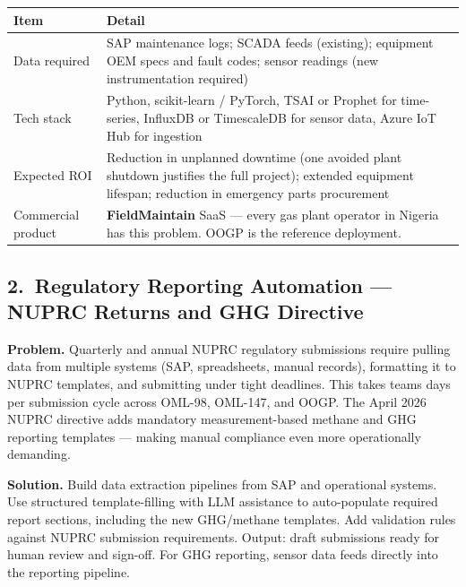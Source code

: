 \documentclass[10pt]{article}
\begin{document}
\vspace{4pt}
\small
\begin{tabularx}{\columnwidth}{@{}lX@{}}
\toprule
\textbf{Item} & \textbf{Detail} \\
\midrule
Data required     & SAP maintenance logs; SCADA feeds (existing); equipment OEM specs
                    and fault codes; sensor readings (new instrumentation required) \\
Tech stack        & Python, scikit-learn / PyTorch, TSAI or Prophet for time-series,
                    InfluxDB or TimescaleDB for sensor data, Azure IoT Hub for ingestion \\
Expected ROI      & Reduction in unplanned downtime (one avoided plant shutdown
                    justifies the full project); extended equipment lifespan; reduction
                    in emergency parts procurement \\
Commercial product & \textbf{FieldMaintain} SaaS --- every gas plant operator in Nigeria
                    has this problem. OOGP is the reference deployment. \\
\bottomrule
\end{tabularx}
\normalsize

\vspace{8pt}

\subsection*{2.\ Regulatory Reporting Automation --- NUPRC Returns and GHG Directive}

{\small
\textbf{Problem.}
Quarterly and annual NUPRC regulatory submissions require pulling data from multiple
systems (SAP, spreadsheets, manual records), formatting it to NUPRC templates, and
submitting under tight deadlines. This takes teams days per submission cycle across
OML-98, OML-147, and OOGP. The April 2026 NUPRC directive adds mandatory
measurement-based methane and GHG reporting templates --- making manual compliance
even more operationally demanding.

\vspace{4pt}
\textbf{Solution.}
Build data extraction pipelines from SAP and operational systems. Use structured
template-filling with LLM assistance to auto-populate required report sections,
including the new GHG/methane templates. Add validation rules against NUPRC submission
requirements. Output: draft submissions ready for human review and sign-off. For
GHG reporting, sensor data feeds directly into the reporting pipeline.
}
\end{document}
